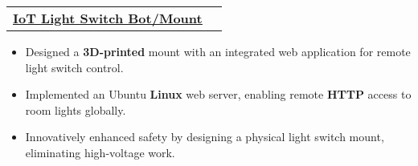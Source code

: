 \documentclass[letterpaper]{article}
\makeatletter
\newcommand{\resumeItem}[1]{
  \item\small{
    {#1 \vspace{-2pt}}
  }
}
\newcommand{\resumeProjectHeading}[2]{
    \item
    \begin{tabular*}{0.97\textwidth}{l@{\extracolsep{\fill}}r}
      \small#1 & #2 \\
    \end{tabular*}\vspace{-7pt}
}
\newcommand{\resumeProjectHeadingWithDetails}[4]{
    \item
    \begin{tabular*}{0.97\textwidth}{l@{\extracolsep{\fill}}r}
      \small#1 & #2 \\[5pt] %
      \textit{\small#3} & \textit{\small #4} \\
    \end{tabular*}\vspace{-7pt}
}
\newcommand{\resumeItemListStart}{\begin{itemize}}
\newcommand{\resumeItemListEnd}{\end{itemize}\vspace{-5pt}}
\makeatother
\begin{document}



\resumeProjectHeading
{\textbf{\href{https://www.gavintranquilino.com/light-switch.html}{\underline{IoT Light Switch Bot/Mount}}} \emph{}}{}
\resumeItemListStart
\resumeItem{Designed a \textbf{3D-printed} mount with an integrated web application for remote light switch control.}
\resumeItem{Implemented an Ubuntu \textbf{Linux} web server, enabling remote \textbf{HTTP} access to room lights globally.}
\resumeItem{Innovatively enhanced safety by designing a physical light switch mount, eliminating high-voltage work.}
\resumeItemListEnd

\end{document}
